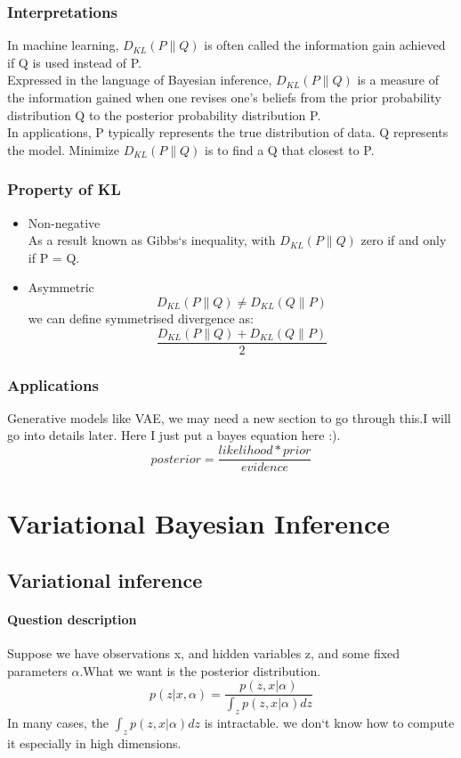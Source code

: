 \documentclass{article}
\begin{document}
\subsubsection{Interpretations}
In machine learning, $D_{KL}(P \parallel Q)$ is often called the information gain achieved if Q is used instead of P.
\\
Expressed in the language of Bayesian inference, $D_{KL}(P \parallel Q)$ is a measure of the information gained when one revises one's beliefs from the prior probability distribution Q to the posterior probability distribution P.\\
In applications, P typically represents the true distribution of data. Q represents the model. Minimize $D_{KL}(P \parallel Q)$ is to find a Q that closest to P.  
\subsubsection{Property of KL}
\begin{itemize}
\item Non-negative \\
As a result known as Gibbs`s inequality, with $D_{KL}(P \parallel Q)$ zero if and only if P = Q.
\item Asymmetric
$$D_{KL}(P \parallel Q) \neq D_{KL}(Q \parallel P)$$
we can define symmetrised divergence as:
$$\frac{D_{KL}(P \parallel Q) + D_{KL}(Q \parallel P)}{2}$$
\end{itemize}
\subsubsection{Applications}
Generative models like VAE, we may need a new section to go through this.I will go into details later. Here I just put a bayes equation here :). 
$$posterior=\frac{likelihood * prior}{evidence}$$

\section{Variational Bayesian Inference}
\subsection{Variational inference}
\paragraph{Question description} Suppose we have observations x, and hidden variables z, and some fixed parameters $\alpha$.What we want is the posterior distribution.
$$p(z|x,\alpha)=\frac{p(z,x|\alpha)}{\int_z p(z,x|\alpha)dz}$$
In many cases, the $\int_z p(z,x|\alpha)dz$ is intractable. we don`t know how to compute it especially in high dimensions.
\end{document}
